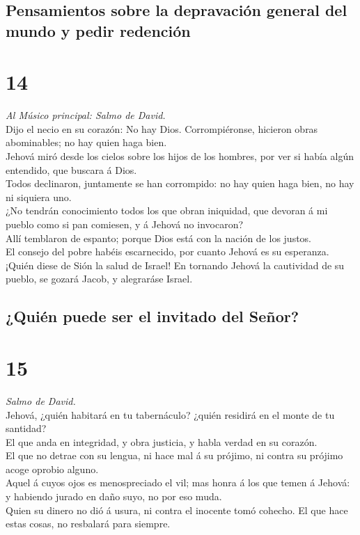 \hypertarget{pensamientos-sobre-la-depravaciuxf3n-general-del-mundo-y-pedir-redenciuxf3n}{%
\subsection{Pensamientos sobre la depravación general del mundo y pedir
redención}\label{pensamientos-sobre-la-depravaciuxf3n-general-del-mundo-y-pedir-redenciuxf3n}}

\hypertarget{section-13}{%
\section{14}\label{section-13}}

 \emph{Al Músico principal: Salmo de David.}\\
Dijo el necio en su corazón: No hay Dios. Corrompiéronse, hicieron obras
abominables; no hay quien haga bien.\\
 Jehová miró desde los cielos sobre los hijos de los
hombres, por ver si había algún entendido, que buscara á Dios.\\
 Todos declinaron, juntamente se han corrompido: no hay
quien haga bien, no hay ni siquiera uno.\\
 ¿No tendrán conocimiento todos los que obran iniquidad, que
devoran á mi pueblo como si pan comiesen, y á Jehová no invocaron?\\
 Allí temblaron de espanto; porque Dios está con la nación
de los justos.\\
 El consejo del pobre habéis escarnecido, por cuanto Jehová
es su esperanza.\\
 ¡Quién diese de Sión la salud de Israel! En tornando Jehová
la cautividad de su pueblo, se gozará Jacob, y alegraráse Israel.

\hypertarget{quiuxe9n-puede-ser-el-invitado-del-seuxf1or}{%
\subsection{¿Quién puede ser el invitado del
Señor?}\label{quiuxe9n-puede-ser-el-invitado-del-seuxf1or}}

\hypertarget{section-14}{%
\section{15}\label{section-14}}

 \emph{Salmo de David.}\\
Jehová, ¿quién habitará en tu tabernáculo? ¿quién residirá en el monte
de tu santidad?\\
 El que anda en integridad, y obra justicia, y habla verdad
en su corazón.\\
 El que no detrae con su lengua, ni hace mal á su prójimo,
ni contra su prójimo acoge oprobio alguno.\\
 Aquel á cuyos ojos es menospreciado el vil; mas honra á los
que temen á Jehová: y habiendo jurado en daño suyo, no por eso muda.\\
 Quien su dinero no dió á usura, ni contra el inocente tomó
cohecho. El que hace estas cosas, no resbalará para siempre.

